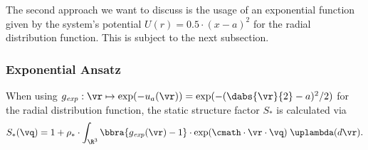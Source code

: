 The second approach we want to discuss is the usage of an exponential function given by the system's potential $U(r) = 0.5\cdot(x-a)^2$ for the radial distribution function. This is subject to the next subsection.




\subsubsection*{Exponential Ansatz}

When using $g_{\mathit{exp}}:\vr\mapsto \exp(-u_a(\vr)) = \exp(-(\dabs{\vr}{2} - a)^2/2)$ for the radial distribution function, the static structure factor $S_*$ is calculated via
\[
    S_*(\vq) = 1 + \rho_*\cdot\int_{\R^3}\bbra{g_{\mathit{exp}}(\vr) - 1}\cdot\exp(\cmath\cdot \vr\cdot \vq)\;\uplambda(d\vr).
\]

